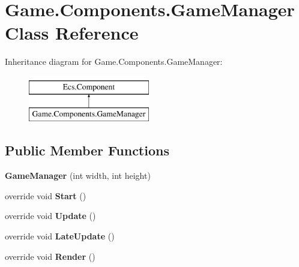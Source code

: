 \hypertarget{class_game_1_1_components_1_1_game_manager}{}\section{Game.\+Components.\+Game\+Manager Class Reference}
\label{class_game_1_1_components_1_1_game_manager}
Inheritance diagram for Game.\+Components.\+Game\+Manager\+:\begin{figure}[H]
\begin{center}
\leavevmode
\includegraphics[height=2.000000cm]{class_game_1_1_components_1_1_game_manager}
\end{center}
\end{figure}
\subsection*{Public Member Functions}
\begin{DoxyCompactItemize}
\item 
\mbox{\label{class_game_1_1_components_1_1_game_manager_a9bdaeb985404b402bc84f9611ecdefa7}} 
{\bfseries Game\+Manager} (int width, int height)
\item 
\mbox{\label{class_game_1_1_components_1_1_game_manager_a3ad0b62c9ca08a624d841a61bb6ab1a1}} 
override void {\bfseries Start} ()
\item 
\mbox{\label{class_game_1_1_components_1_1_game_manager_a8b7bb5ae416225ca1232af92de3b0284}} 
override void {\bfseries Update} ()
\item 
\mbox{\label{class_game_1_1_components_1_1_game_manager_a366f9a3a0d77d2c483cef176eb573dfd}} 
override void {\bfseries Late\+Update} ()
\item 
\mbox{\label{class_game_1_1_components_1_1_game_manager_a1bfad82d8aff8d0811fbcd93c0cc491e}} 
override void {\bfseries Render} ()
\end{DoxyCompactItemize}
